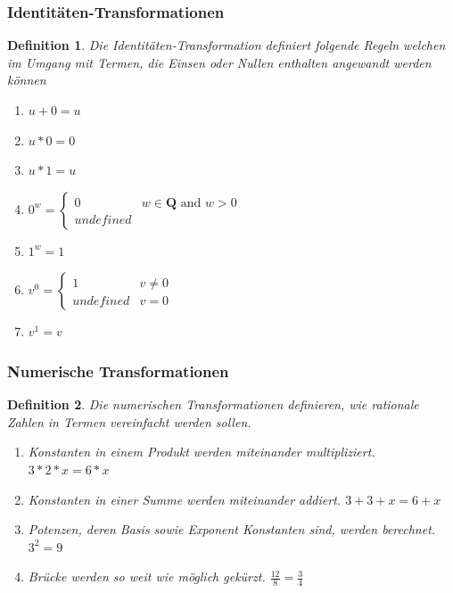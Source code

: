 \documentclass[11pt]{article}
\newtheorem{defin}{Definition}
\begin{document}
\subsubsection{Identitäten-Transformationen}

\begin{defin}
  \label{def:identitaeten_transformation}
  Die Identitäten-Transformation definiert folgende Regeln welchen im Umgang mit Termen, die
  Einsen oder Nullen enthalten angewandt werden können
  \begin{enumerate}
    \item $u+0 = u$
    \item $u*0 = 0$
    \item $u*1 = u$
    \item $
            0^w = \left\{
                \begin{array}{ll}
                    0         & w \in \mathbf{Q} \textrm{ and } w > 0 \\
                    undefined & 
                \end{array}
            \right.$
    \item $1^w = 1$
    \item $
          v^0 = \left\{
              \begin{array}{ll}
                  1         & v \neq 0 \\
                  undefined & v = 0 
              \end{array}
          \right.
          $
    \item $v^1 = v$
  \end{enumerate}
\end{defin}

\subsubsection{Numerische Transformationen}
\begin{defin}
  \label{def:numerische_transformation}
  Die numerischen Transformationen definieren, wie rationale Zahlen in Termen vereinfacht werden sollen.

  \begin{enumerate}
    \item Konstanten in einem Produkt werden miteinander multipliziert. $3*2*x = 6*x$
    \item Konstanten in einer Summe werden miteinander addiert. $3+3+x = 6+x$
    \item Potenzen, deren Basis sowie Exponent Konstanten sind, werden berechnet. $3^2 = 9$
    \item Brücke werden so weit wie möglich gekürzt. $\frac{12}{8} = \frac{3}{4}$
  \end{enumerate}
\end{defin}
\end{document}
